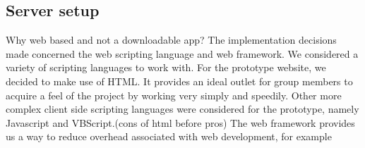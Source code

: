 \subsection{Server setup}

Why web based and not a downloadable app? The implementation decisions made concerned the web scripting language and web framework. 
We considered a variety of scripting languages to work with. For the prototype website, we decided to make use of HTML. It provides an ideal outlet for group members to acquire a feel of the project by working very simply and speedily. Other more complex client side scripting languages were considered for the prototype, namely Javascript and VBScript.(cons of html before pros)
The web framework provides us a way to reduce overhead associated with web development, for example 

